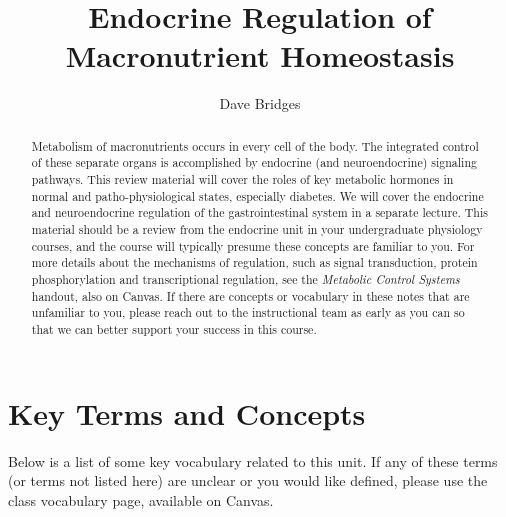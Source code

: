 \documentclass{tufte-handout}
\title{Endocrine Regulation of Macronutrient Homeostasis}
\author{Dave Bridges}
\begin{document}
\maketitle%

\begin{abstract}
\noindent Metabolism of macronutrients occurs in every cell of the body.  The integrated control of these separate organs is accomplished by endocrine (and neuroendocrine) signaling pathways.  This review material will cover the roles of  key metabolic hormones in normal and patho-physiological states, especially diabetes.  We will cover the endocrine and neuroendocrine regulation of the gastrointestinal system in a separate lecture.  This material should be a review from the endocrine unit in your undergraduate physiology courses, and the course will typically presume these concepts are familiar to you.  For more details about the mechanisms of regulation, such as signal transduction, protein phosphorylation and transcriptional regulation, see the \emph{Metabolic Control Systems} handout, also on Canvas.  If there are concepts or vocabulary in these notes that are unfamiliar to you, please reach out to the instructional team as early as you can so that we can better support your success in this course.
\end{abstract}

\tableofcontents


\pagebreak{}

\section{Key Terms and Concepts}

Below is a list of some key vocabulary related to this unit.  If any of these terms (or terms not listed here) are unclear or you would like defined, please use the class vocabulary page, available on Canvas.
\end{document}
